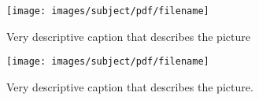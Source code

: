 % 
%
%
%

\begin{figure}[H]
    \centering
    \texttt{[image: images/subject/pdf/filename]}
    \caption{Very descriptive caption that describes the picture}
    \label{fig:unique_figure_label}
\end{figure}


\begin{figure}[H]
    \centering
    \texttt{[image: images/subject/pdf/filename]}
    \caption{Very descriptive caption that describes the picture.}
    \label{fig:PLEASE_FIX_ME}
\end{figure}



